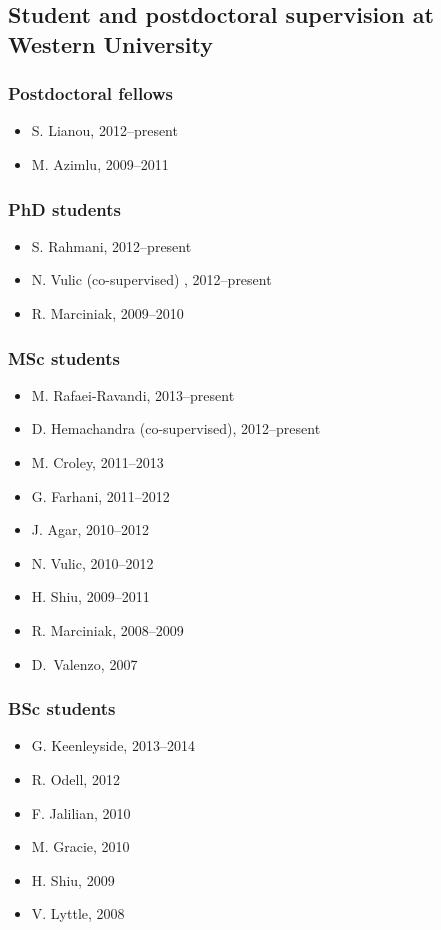 \documentclass[12pt]{article}
\begin{document}
\subsection{Student and postdoctoral supervision at Western University}

\subsubsection{Postdoctoral fellows}
\begin{itemize}
\item S. Lianou, 2012--present
\item  M. Azimlu, 2009--2011
\end{itemize}

\subsubsection{PhD students}
\begin{itemize}
\item S. Rahmani, 2012--present
\item N. Vulic (co-supervised) , 2012--present
\item R. Marciniak, 2009--2010
\end{itemize}

\subsubsection{MSc students}
\begin{itemize}
\item M. Rafaei-Ravandi, 2013--present
\item D. Hemachandra (co-supervised), 2012--present
\item M. Croley, 2011--2013
\item G. Farhani, 2011--2012
 \item J. Agar, 2010--2012
\item N. Vulic, 2010--2012
\item H. Shiu, 2009--2011
\item R. Marciniak, 2008--2009
\item D.\ Valenzo, 2007
\end{itemize}

\subsubsection{BSc students}
\begin{itemize}
\item G. Keenleyside, 2013--2014
\item R. Odell, 2012
\item F. Jalilian, 2010
\item M. Gracie, 2010
\item H. Shiu, 2009
\item V. Lyttle, 2008
\end{itemize}
\end{document}
